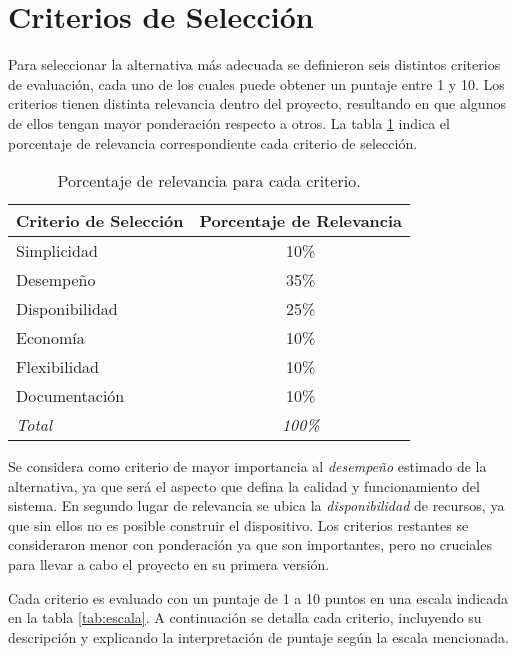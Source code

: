 \section{Criterios de Selección}
\par Para seleccionar la alternativa más adecuada se definieron seis distintos criterios de evaluación, cada uno de los cuales puede obtener un puntaje entre 1 y 10. Los criterios tienen distinta relevancia dentro del proyecto, resultando en que algunos de ellos tengan mayor ponderación respecto a otros. La tabla \ref{tab:criterios} indica el porcentaje de relevancia correspondiente cada criterio de selección. 

\begin{table}[H]
	\centering
	\begin{tabular}{|l|c|}
		\hline
		\textbf{Criterio de Selección} & \textbf{Porcentaje de Relevancia} \\ \hline
		Simplicidad & 10\% \\ \hline
		Desempeño & 35\% \\ \hline
		Disponibilidad & 25\% \\ \hline
		Economía & 10\% \\ \hline
		Flexibilidad & 10\% \\ \hline
		Documentación & 10\% \\ \hline
		\textit{Total} & \textit{100\%} \\ \hline
	\end{tabular}
	\caption{Porcentaje de relevancia para cada criterio.}
	\label{tab:criterios}
\end{table}

\newpage
\par Se considera como criterio de mayor importancia al \textit{desempeño} estimado de la alternativa, ya que será el aspecto que defina la calidad y funcionamiento del sistema. En segundo lugar de relevancia se ubica la \textit{disponibilidad} de recursos, ya que sin ellos no es posible construir el dispositivo. Los criterios restantes se consideraron menor con ponderación ya que son importantes, pero no cruciales para llevar a cabo el proyecto en su primera versión.
\par Cada criterio es evaluado con un puntaje de 1 a 10 puntos en una escala indicada en la tabla \ref{tab:escala}. A continuación se detalla cada criterio, incluyendo su descripción y explicando la interpretación de puntaje según la escala mencionada.


